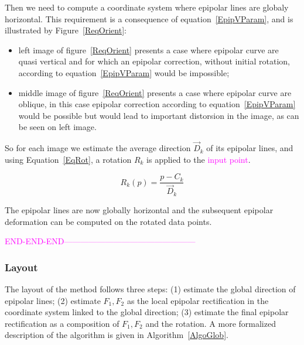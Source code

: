 \documentclass{ipol}
\newcommand{\mpd}[1]{\textcolor{magenta}{#1}}
\newcommand{\ENDCHANGE}{\textcolor{magenta} {END-END-END------------------------------------------------}}
\begin{document}
Then we need to compute a coordinate system where epipolar lines are globaly horizontal. This requirement is
a consequence of equation~\eqref{EpipVParam}, and is illustrated by Figure~\ref{ReqOrient}:


\begin{itemize}
   \item left image of figure~\ref{ReqOrient} presents a case where epipolar curve are quasi vertical
         and for which an epipolar correction, without initial rotation,  
          according to equation~\eqref{EpipVParam} would be impossible;
   \item middle image of figure~\ref{ReqOrient} presents a case where epipolar curve are oblique,
         in this case epipolar correction according to equation~\eqref{EpipVParam} would be possible
         but would lead to important distorsion in the image, as can be seen on left image.
\end{itemize}


So for each image we estimate the average direction $\vec{D}_k$
of its epipolar lines, and using Equation~\eqref{EqRot}, a rotation $R_k$ is applied to the  \mpd{input point}. 

\begin{equation}
    R_k(p) =  \frac{p-C_k}{\vec{D}_k}  \label{EqRot}
\end{equation}

The epipolar lines are now globally horizontal and the subsequent epipolar deformation can be computed on the rotated data points. 

\ENDCHANGE{}

\subsubsection{Layout}

The layout of the method follows three steps: (1) estimate the global 
direction of epipolar lines; (2) estimate $F_1,F_2$ as  the local epipolar rectification
 in the coordinate system linked to the global direction; (3)  estimate the final
epipolar rectification as a composition of $F_1,F_2$ and the rotation.
A more formalized description of the algorithm is given in Algorithm~\ref{AlgoGlob}.
\end{document}
